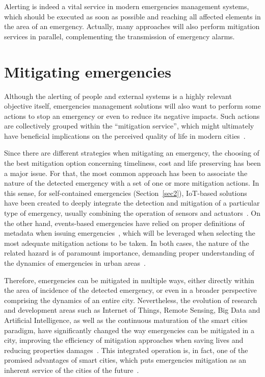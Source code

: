 \begin{refsection}
Alerting is indeed a vital service in modern emergencies management systems, which should be executed as soon as possible and reaching all affected elements in the area of an emergency. Actually, many approaches will also perform mitigation services in parallel, complementing the transmission of emergency alarms.

\section{Mitigating emergencies}\label{sec6}

Although the alerting of people and external systems is a highly relevant objective itself, emergencies management solutions will also want to perform some actions to stop an emergency or even to reduce its negative impacts. Such actions are collectively grouped within the ``mitigation service'', which might ultimately have beneficial implications on the perceived quality of life in modern cities~\cite{emergenciesmetric1,smartsensing3}.

Since there are different strategies when mitigating an emergency, the choosing of the best mitigation option concerning timeliness, cost and life preserving has been a major issue. For that, the most common approach has been to associate the nature of the detected emergency with a set of one or more mitigation actions. In this sense, for self-contained emergencies (Section~\ref{sec2}), IoT-based solutions have been created to deeply integrate the detection and mitigation of a particular type of emergency, usually combining the operation of sensors and actuators~\cite{smartcities2,PlatformsSC}. On the other hand, events-based emergencies have relied on proper definitions of metadata when issuing emergencies~\cite{emergenciesmetric2,emergenciesxml2}, which will be leveraged when selecting the most adequate mitigation actions to be taken. In both cases, the nature of the related hazard is of paramount importance, demanding proper understanding of the dynamics of emergencies in urban areas~\cite{citiesemergencies1,emergenciesgeneral1}. 

Therefore, emergencies can be mitigated in multiple ways, either directly within the area of incidence of the detected emergency, or even in a broader perspective comprising the dynamics of an entire city. Nevertheless, the evolution of research and development areas such as Internet of Things, Remote Sensing, Big Data and Artificial Intelligence, as well as the continuous maturation of the smart cities paradigm, have significantly changed the way emergencies can be mitigated in a city, improving the efficiency of mitigation approaches when saving lives and reducing properties damages~\cite{smartcities1,smartcities2,smartcities3}. This integrated operation is, in fact, one of the promised advantages of smart cities, which puts emergencies mitigation as an inherent service of the cities of the future~\cite{smartcities9}. 


\end{refsection}
